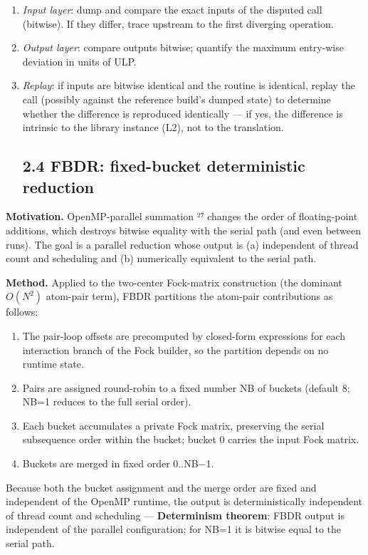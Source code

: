 \documentclass[preprint,12pt]{elsarticle}
\begin{document}
\begin{enumerate}
\item \textit{Input layer}: dump and compare the exact inputs of the disputed call (bitwise). If they differ, trace upstream to the first diverging operation.
\item \textit{Output layer}: compare outputs bitwise; quantify the maximum entry-wise deviation in units of ULP.
\item \textit{Replay}: if inputs are bitwise identical and the routine is identical, replay the call (possibly against the reference build's dumped state) to determine whether the difference is reproduced identically --- if yes, the difference is intrinsic to the library instance (L2), not to the translation.

\subsection{2.4 FBDR: fixed-bucket deterministic reduction}
\end{enumerate}

\textbf{Motivation.} OpenMP-parallel summation ²⁷ changes the order of floating-point additions, which destroys bitwise equality with the serial path (and even between runs). The goal is a parallel reduction whose output is (a) independent of thread count and scheduling and (b) numerically equivalent to the serial path.

\textbf{Method.} Applied to the two-center Fock-matrix construction (the dominant $O(N^2)$ atom-pair term), FBDR partitions the atom-pair contributions as follows:

\begin{enumerate}
\item The pair-loop offsets are precomputed by closed-form expressions for each interaction branch of the Fock builder, so the partition depends on no runtime state.
\item Pairs are assigned round-robin to a fixed number NB of buckets (default 8; NB=1 reduces to the full serial order).
\item Each bucket accumulates a private Fock matrix, preserving the serial subsequence order within the bucket; bucket 0 carries the input Fock matrix.
\item Buckets are merged in fixed order 0..NB$-$1.
\end{enumerate}

Because both the bucket assignment and the merge order are fixed and independent of the OpenMP runtime, the output is deterministically independent of thread count and scheduling --- \textbf{Determinism theorem}: FBDR output is independent of the parallel configuration; for NB=1 it is bitwise equal to the serial path.
\end{document}
